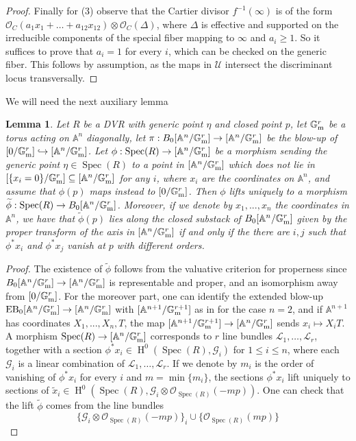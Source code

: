 \documentclass{amsart}
\newcommand{\bA}{\mathbb{A}}
\newcommand{\bG}{\mathbb{G}}
\newcommand{\oH}{\operatorname{H}}
\newcommand{\cG}{\mathcal{G}}
\newcommand{\cL}{\mathcal{L}}
\newcommand{\cO}{\mathcal{O}}
\newcommand{\cU}{\mathcal{U}}
\newcommand{\spec}{\operatorname{Spec}}
\newcommand{\Gm}{\bG_{{\rm m}}}
\DeclareMathOperator{\EB}{EB}
\newtheorem{Lemma}[theorem]{Lemma}
\theoremstyle{definition}
\theoremstyle{definition}
\begin{document}
{\begin{proof}
    Finally for (3) observe that the Cartier divisor $f^{-1}(\infty)$ is of the form $\cO_C(a_1x_1+\ldots +a_{12}x_{12})\otimes \cO_C(\Delta)$, where $\Delta$ is effective and supported on the irreducible components of the special fiber mapping to $\infty$ and $a_i\ge 1$. So it suffices to prove that $a_i=1$ for every $i$, which can be checked on the generic fiber. This follows by assumption, as the maps in $\cU$ intersect the discriminant locus transversally.
\end{proof}
We will need the next auxiliary lemma
\begin{Lemma}\label{lemma_when_a_map_from_a_dvr_to_An_lifts_to_the_blow_up_without_the_proper_transform_of_the_axis}
    Let $R$ be a DVR with generic point $\eta$ and closed point $p$, let $\Gm^r$ be a torus acting on $\bA^n$ diagonally, let $\pi:B_0[\bA^n/\Gm^r]\to [\bA^n/\Gm^r]$ be the blow-up of $[0/\Gm^r]\hookrightarrow [\bA^n/\Gm^r]$.  Let $\phi:\spec(R)\to [\bA^n/\Gm^r]$ be a morphism sending the generic point $\eta\in\spec(R)$ to a point in $[\bA^n/\Gm^r]$ which does not lie in $[\{x_i=0\}/\Gm^r]\subseteq [\bA^n/\Gm^r]$ for any $i$, where $x_i$ are the coordinates on $\bA^n$, and assume that $\phi(p)$ maps instead to $[0/\Gm^r]$. Then $\phi$ lifts uniquely to a morphism $\widetilde{\phi}:\spec(R)\to B_0[\bA^n/\Gm^r]$. Moreover, if we denote by $x_1,...,x_n$ the coordinates in $\bA^n$, we have that $\widetilde{\phi}(p)$ lies along the closed substack of $B_0[\bA^n/\Gm^r]$ given by the proper transform of the axis in $[\bA^n/\Gm^r]$ if and only if the there are $i,j$ such that $\phi^*x_i$ and $\phi^*x_j$ vanish at $p$ with different orders.
\end{Lemma}
\begin{proof}
    The existence of $\widetilde{\phi}$ follows from the valuative criterion for properness since $B_0[\bA^n/\Gm^r]\to [\bA^n/\Gm^r]$ is representable and proper, and an isomorphism away from $[0/\Gm^r]$. For the moreover part, one can identify the extended blow-up $\EB_0[\bA^n/\Gm^r]\to [\bA^n/\Gm^r]$ with $[\bA^{n+1}/\Gm^{r+1}]$ as in  for the case $n=2$, and if $\bA^{n+1}$ has coordinates $X_1,...,X_n,T$, the map $[\bA^{n+1}/\Gm^{r+1}]\to [\bA^{n}/\Gm^{r}]$ sends $x_i\mapsto X_iT$. A morphism $\spec(R)\to [\bA^n/\Gm^r]$ corresponds to $r$ line bundles $\cL_1,\ldots,\cL_r$, together with a section $\phi^*x_i\in \oH^0(\spec(R),\cG_i)$ for $1\le i\le n$, where each $\cG_i$ is a linear combination of $\cL_1,\ldots,\cL_r$.
    If we denote by $m_i$ is the order of vanishing of $\phi^*x_i$ for every $i$ and $m=\min\{m_i\}$, the sections $\phi^*x_i$ lift uniquely to sections of $\widetilde{x}_i\in \oH^0(\spec(R),\cG_i\otimes \cO_{\spec(R)}(-mp))$. One can check that the lift $\widetilde{\phi}$ comes from the line bundles \[\{\cG_i\otimes \cO_{\spec(R)}(-mp)\}_i\cup\{\cO_{\spec(R)}(mp)\}\]

\end{proof}}
\end{document}
